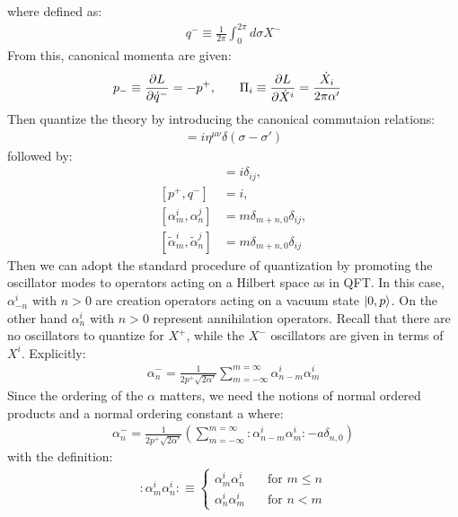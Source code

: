 where defined as:
\begin{align}
    q^{-} \equiv \frac{1}{2\pi} \int _{0} ^{2\pi} d\sigma X^{-}
\end{align}
From this, canonical momenta are given:
\begin{align}
    p_{-} \equiv \pdv{L}{\dot{q}^{-}} = -p^{+}, & \qq{} \Pi _{i} \equiv \pdv{L}{\dot{X}^{i}}= \frac{\dot{X}_{i}}{2\pi \alpha'}
\end{align}
Then quantize the theory by introducing the canonical commutaion relations:
\begin{align}
    [X^{\mu}(\tau,\sigma), \Pi^{\mu} (\tau,\sigma;)] = i\eta ^{\mu \nu} \delta(\sigma - \sigma')
\end{align}
followed by:
\begin{align}
    [x^{i},p^i] &= i\delta_{ij}, \\
    [p^{+},q^{-}] &= i, \\
    [\alpha _{m}^{i},\alpha _{n}^{j}] &= m\delta_{m+n,0}\delta_{ij},\\
    [\tilde{\alpha}_{m}^{i}, \tilde{\alpha}_{n}^{j}] &= m\delta_{m+n,0} \delta_{ij} 
\end{align}
Then we can adopt the standard procedure of quantization by promoting the oscillator modes to operators acting on a Hilbert space as in QFT. In this case, $\alpha_{-n} ^{i}$ with $n>0$ are creation operators acting on a vacuum state $\ket{0,p}$. On the other hand $\alpha_{n}^{i}$ with $n>0$ represent annihilation operators. Recall that there are no oscillators to quantize for $X^{+}$, while the $X^{-}$ oscillators are given in terms of $X^{i}$. Explicitly:
\begin{align}
    \alpha _{n}^{-} = \frac{1}{2p^{+}\sqrt{2\alpha'}} \sum _{m=-\infty} ^{m=\infty} \alpha _{n-m} ^{i} \alpha _{m} ^{i}
\end{align}
Since the ordering of the $\alpha$ matters, we need the notions of normal ordered products and a normal ordering constant a where:
\begin{align}
    \alpha_{n} ^{-} = \frac{1}{2p^{+} \sqrt{2\alpha'}} \left( \sum_{m=-\infty} ^{m=\infty} :\alpha_{n-m}^{i} \alpha_{m}^{i}: -a\delta_{n,0} \right) 
\end{align}
with the definition:
\begin{align}
    :\alpha_{m}^{i} \alpha_{n}^{i}: \equiv 
    \begin{cases}
        \alpha_{m}^{i} \alpha_{n}^{i} & \quad \text{for } m \leq n \\
        \alpha_{n}^{i} \alpha_{m}^{i} & \quad \text{for } n < m 
    \end{cases}
\end{align}
